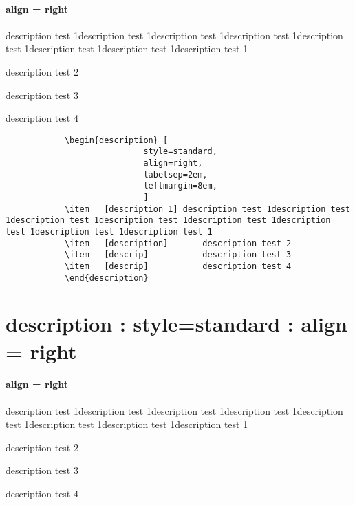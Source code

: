 \documentclass[12pt, a4paper, oneside]{book}
\let\stdsection\section
\renewcommand\section{\newpage\stdsection}
\begin{document}
			\paragraph{ align = right }
			\begin{description}	[
							style=standard, 
							align=right,
							labelsep=2em,
							leftmargin=8em,
							]
			\item	[description 1]	description test 1description test 1description test 1description test 1description test 1description test 1description test 1description test 1
			\item	[description]		description test 2
			\item	[descrip]			description test 3
			\item	[descrip]			description test 4
			\end{description}

		\begin{mdframed}[style=code_document, frametitle={code}]
			\begin{verbatim}
			\begin{description}	[
							style=standard, 
							align=right,
							labelsep=2em,
							leftmargin=8em,
							]
			\item	[description 1]	description test 1description test 1description test 1description test 1description test 1description test 1description test 1description test 1
			\item	[description]		description test 2
			\item	[descrip]			description test 3
			\item	[descrip]			description test 4
			\end{description}
			\end{verbatim}
		\end{mdframed}


	\section{description : style=standard : align = right}

			\paragraph{ align = right }
			\begin{description}	[
							style=standard, 
							align=right,
							labelwidth=8em,
							labelsep=2em,
							leftmargin=10em,
							]
			\item	[description 1]	description test 1description test 1description test 1description test 1description test 1description test 1description test 1description test 1
			\item	[description]		description test 2
			\item	[descrip]			description test 3
			\item	[descrip]			description test 4
			\end{description}
			
\end{document}
